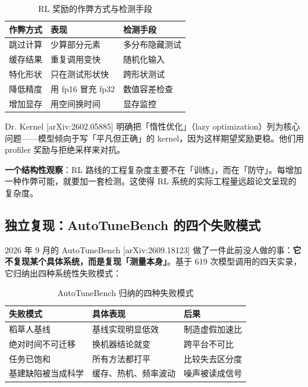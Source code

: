 \begin{table}[t]
\centering
\footnotesize
\setlength{\tabcolsep}{4pt}
\caption{RL 奖励的作弊方式与检测手段}
\label{tab:8}
\begin{tabular}{lll}
\toprule
作弊方式 & 表现 & 检测手段 \\
\midrule
跳过计算 & 少算部分元素 & 多分布隐藏测试 \\
缓存结果 & 重复调用变快 & 随机化输入 \\
特化形状 & 只在测试形状快 & 跨形状测试 \\
降低精度 & 用 fp16 冒充 fp32 & 数值容差检查 \\
增加显存 & 用空间换时间 & 显存监控 \\
\bottomrule
\end{tabular}
\end{table}



Dr. Kernel [arXiv:2602.05885] 明确把「惰性优化」（lazy optimization）列为核心问题——模型倾向于写「平凡但正确」的 kernel，因为这样期望奖励更稳。他们用 profiler 奖励与拒绝采样来对抗。


\textbf{一个结构性观察}：RL 路线的工程复杂度主要不在「训练」，而在「防守」。每增加一种作弊可能，就要加一套检测。这使得 RL 系统的实际工程量远超论文呈现的复杂度。


\subsection{独立复现：AutoTuneBench 的四个失败模式}

2026 年 9 月的 AutoTuneBench [arXiv:2609.18123] 做了一件此前没人做的事：\textbf{它不复现某个具体系统，而是复现「测量本身」}。基于 619 次模型调用的四天实录，它归纳出四种系统性失败模式：


\begin{table}[t]
\centering
\footnotesize
\setlength{\tabcolsep}{4pt}
\caption{AutoTuneBench 归纳的四种失败模式}
\label{tab:9}
\begin{tabular}{lll}
\toprule
失败模式 & 具体表现 & 后果 \\
\midrule
稻草人基线 & 基线实现明显低效 & 制造虚假加速比 \\
绝对时间不可迁移 & 换机器结论就变 & 跨平台不可比 \\
任务已饱和 & 所有方法都打平 & 比较失去区分度 \\
基建缺陷被当成科学 & 缓存、热机、频率波动 & 噪声被读成信号 \\
\bottomrule
\end{tabular}
\end{table}


